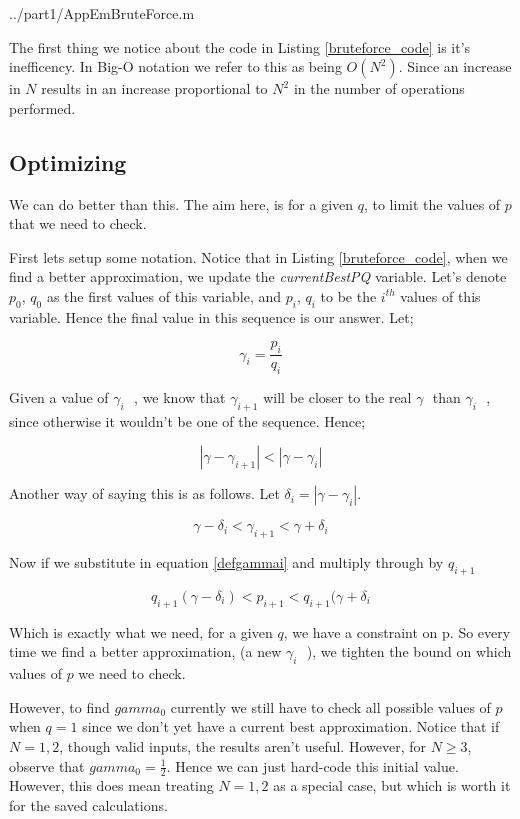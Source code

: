 \documentclass[10pt]{article}
\newcommand*{\gam}{$\gamma \text{ }$}
\newcommand*{\gami}{$\gamma_{i} \text{ }$}
\begin{document}
   {../part1/AppEmBruteForce.m}

The first thing we notice about the code in Listing \ref{bruteforce_code} is it's inefficency. In Big-O notation we refer to this as being $O(N^2)$. Since an increase in $N$ results in an increase proportional to $N^2$ in the number of operations performed.

\subsection{Optimizing}
We can do better than this. The aim here, is for a given $q$, to limit the values of $p$ that we need to check. 

First lets setup some notation. Notice that in Listing \ref{bruteforce_code}, when we find a better approximation, we update the \emph{currentBestPQ} variable. Let's denote $p_0$, $q_0$  as the first values of this variable, and $p_i$, $q_i$ to be the $i^{th}$ values of this variable. Hence the final value in this sequence is our answer. Let;

\begin{equation} \label{defgammai}
  \gamma_i = \frac{p_i}{q_i} 
\end{equation}


Given a value of \gami, we know that $\gamma_{i+1}$ will be closer to the real \gam than \gami, since otherwise it wouldn't be one of the sequence. Hence;

$$ |\gamma- \gamma_{i+1}| < |\gamma - \gamma_{i}| $$

Another way of saying this is as follows. Let $\delta_{i} = | \gamma - \gamma_i  |$. 

$$ \gamma - \delta_i < \gamma_{i+1} < \gamma + \delta_i $$

Now if we substitute in equation \ref{defgammai} and multiply through by $q_{i+1}$

\begin{equation} \label{em_constraint}
q_{i+1} (\gamma - \delta_i) < p_{i+1} < q_{i+1} ( \gamma + \delta_i 
\end{equation} 

Which is exactly what we need, for a given $q$, we have a constraint on p. So every time we find a better approximation, (a new \gami), we tighten the bound on which values of $p$ we need to check.

However, to find $gamma_0$ currently we still have to check all possible values of $p$ when $q = 1$ since we don't yet have a current best approximation. Notice that if $N = 1,2$, though valid inputs, the results aren't useful. However, for $N \geq 3$, observe that $gamma_0 = \frac{1}{2}$. Hence we can just hard-code this initial value. However, this does mean treating $N = 1,2$ as a special case, but which is worth it for the saved calculations.
\end{document}

